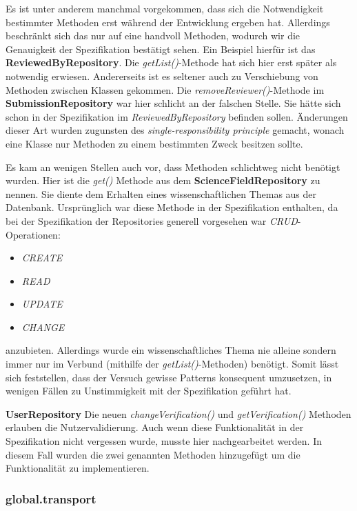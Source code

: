 Es ist unter anderem manchmal vorgekommen, dass sich die Notwendigkeit bestimmter
Methoden erst während der Entwicklung ergeben hat.
Allerdings beschränkt sich das nur auf eine handvoll Methoden, wodurch wir die Genauigkeit der Spezifikation bestätigt
sehen.
Ein Beispiel hierfür ist das \textbf{ReviewedByRepository}.
Die \emph{getList()}-Methode hat sich hier erst später als notwendig erwiesen.
Andererseits ist es seltener auch zu Verschiebung von Methoden zwischen Klassen gekommen.
Die \emph{removeReviewer()}-Methode im \textbf{SubmissionRepository}  war hier schlicht an
der falschen Stelle.
Sie hätte sich schon in der Spezifikation im \emph{ReviewedByRepository} befinden sollen.
Änderungen dieser Art wurden zugunsten des \emph{single-responsibility principle} gemacht,
wonach eine Klasse nur Methoden zu einem bestimmten Zweck besitzen sollte.

Es kam an wenigen Stellen auch vor, dass Methoden schlichtweg nicht benötigt wurden.
Hier ist die \emph{get()} Methode aus dem \textbf{ScienceFieldRepository} zu nennen.
Sie diente dem Erhalten eines wissenschaftlichen Themas aus der Datenbank.
Ursprünglich war diese Methode in der Spezifikation enthalten, da
bei der Spezifikation der Repositories generell
vorgesehen war \emph{CRUD}-Operationen:
\begin{itemize}
    \item \emph{CREATE}
    \item \emph{READ}
    \item \emph{UPDATE}
    \item \emph{CHANGE}
\end{itemize}
anzubieten.
Allerdings wurde ein wissenschaftliches Thema nie alleine sondern immer nur im Verbund
(mithilfe der \emph{getList()}-Methoden) benötigt.
Somit lässt sich feststellen, dass der Versuch gewisse Patterns konsequent umzusetzen,
in wenigen Fällen zu Unstimmigkeit mit der Spezifikation geführt hat.

\textbf{UserRepository} Die neuen \emph{changeVerification()} und \emph{getVerification()}
Methoden erlauben die Nutzervalidierung. Auch wenn diese Funktionalität in der Spezifikation nicht
vergessen wurde, musste hier nachgearbeitet werden.
In diesem Fall wurden die zwei genannten Methoden hinzugefügt um die Funktionalität zu implementieren.

\subsubsection{global.transport}

